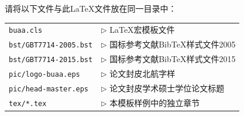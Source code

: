请将以下文件与此LaTeX文件放在同一目录中：

\begin{tabular}{ll}
 \verb|buaa.cls |                 & $\triangleright$ LaTeX宏模板文件 \\
 \verb|bst/GBT7714-2005.bst|      & $\triangleright$ 国标参考文献BibTeX样式文件2005 \\
 \verb|bst/GBT7714-2015.bst|      & $\triangleright$ 国标参考文献BibTeX样式文件2015 \\
 \verb|pic/logo-buaa.eps|         & $\triangleright$ 论文封皮北航字样 \\
 \verb|pic/head-master.eps|       & $\triangleright$ 论文封皮学术硕士学位论文标题\\
 \verb|tex/*.tex|                 & $\triangleright$ 本模板样例中的独立章节\\
\end{tabular}\\

